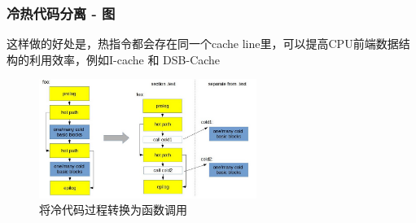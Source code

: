 \begin{frame}
    \frametitle{冷热代码分离 - 图}
这样做的好处是，热指令都会存在同一个cache line里，可以提高CPU前端数据结构的利用效率，例如I-cache 和 DSB-Cache
    \begin{figure}
        \centering
        \includegraphics[width=0.63\textwidth]{images/splitting.png}
\caption{将冷代码过程转换为函数调用}
    \end{figure}

\end{frame}